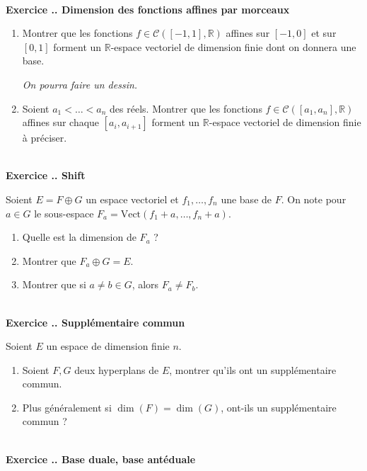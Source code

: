 \documentclass{article}
\newcommand{\mb}[1]{\mathbb{#1}}
\newcommand{\mc}[1]{\mathcal{#1}}
\newcounter{exo}
\newcommand{\exercice}[1][\null]{\textbf{\\ Exercice \thesection.\theexo. #1} \addtocounter{exo}{1}}
\begin{document}
\exercice[Dimension des fonctions affines par morceaux]

\begin{enumerate}

\item Montrer que les fonctions $f \in \mc{C}([-1,1], \mb{R})$ affines sur $[-1,0]$ et sur $[0,1]$ forment un $\mb{R}$-espace vectoriel de dimension finie dont on donnera une base.

\emph{On pourra faire un dessin.}

\item Soient $a_1 < \dots <a_n$ des réels. Montrer que les fonctions $f \in \mc{C}([a_1,a_n], \mb{R})$ affines sur chaque $[a_i, a_{i+1}]$ forment un $\mb{R}$-espace vectoriel de dimension finie à préciser.

\end{enumerate}


\exercice[Shift]

Soient $E = F \oplus G$ un espace vectoriel et $f_1, \dots, f_n$ une base de $F$. On note pour $a \in G$ le sous-espace $F_a = \text{Vect}(f_1 +a, \dots, f_n + a)$.

\begin{enumerate}

\item Quelle est la dimension de $F_a$ ?

\item Montrer que $F_a \oplus G = E$.

\item Montrer que si $a \neq b \in G$, alors $F_a \neq F_b$.

\end{enumerate}




\exercice[Supplémentaire commun]

Soient $E$ un espace de dimension finie $n$.

\begin{enumerate}

\item Soient $F,G$ deux hyperplans de $E$, montrer qu'ils ont un supplémentaire commun.

\item Plus généralement si $\dim(F) = \dim(G)$, ont-ils un supplémentaire commun ?

\end{enumerate}




\exercice[Base duale, base antéduale]
\end{document}
